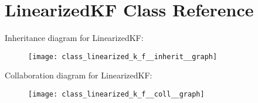 \hypertarget{class_linearized_k_f}{\section{\-Linearized\-K\-F \-Class \-Reference}
\label{class_linearized_k_f}
}


\-Inheritance diagram for \-Linearized\-K\-F\-:
\nopagebreak
\begin{figure}[H]
\begin{center}
\leavevmode
\texttt{[image: class\_linearized\_k\_f\_\_inherit\_\_graph]}
\end{center}
\end{figure}


\-Collaboration diagram for \-Linearized\-K\-F\-:
\nopagebreak
\begin{figure}[H]
\begin{center}
\leavevmode
\texttt{[image: class\_linearized\_k\_f\_\_coll\_\_graph]}
\end{center}
\end{figure}
